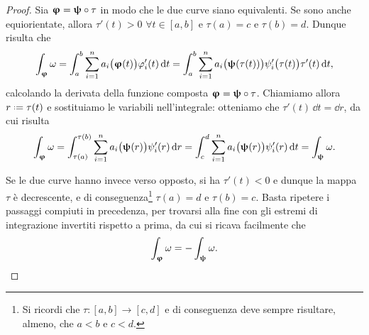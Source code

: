 \begin{proof}
	Sia $\bm{\upvarphi}=\bm{\uppsi}\circ\tau$ in modo che le due curve siano equivalenti.
	Se sono anche equiorientate, allora $\tau'(t)>0$ $\forall t\in[a,b]$ e $\tau(a)=c$ e $\tau(b)=d$.
	Dunque risulta che
	\begin{equation}
		\int_{\bm{\upvarphi}}\omega=\int_a^b\sum_{i=1}^na_i\big(\bm{\upvarphi}(t)\big)\varphi_i'(t)\,\textup{d} t
		=\int_a^b\sum_{i=1}^na_i\big(\bm{\uppsi}(\tau(t))\big)\psi_i'\big(\tau(t)\big)\tau'(t)\,\textup{d} t,
	\end{equation}
	calcolando la derivata della funzione composta $\bm{\upvarphi}=\bm{\uppsi}\circ\tau$.
	Chiamiamo allora $r\defeq\tau(t)$ e sostituiamo le variabili nell'integrale: otteniamo che $\tau'(t)\,\dd t=\dd r$, da cui risulta
	\begin{equation}
		\int_{\bm{\upvarphi}}\omega=\int_{\tau(a)}^{\tau(b)}\sum_{i=1}^na_i\big(\bm{\uppsi}(r)\big)\psi_i'(r)\,\textup{d} r
		=\int_c^d\sum_{i=1}^na_i\big(\bm{\uppsi}(r)\big)\psi_i'(r)\,\textup{d} t=\int_{\bm{\uppsi}}\omega.
	\end{equation}
	
	Se le due curve hanno invece verso opposto, si ha $\tau'(t)<0$ e dunque la mappa $\tau$ è decrescente, e di conseguenza\footnote{Si ricordi che $\tau\colon[a,b]\to[c,d]$ e di conseguenza deve sempre risultare, almeno, che $a<b$ e $c<d$.} $\tau(a)=d$ e $\tau(b)=c$. Basta ripetere i passaggi compiuti in precedenza, per trovarsi alla fine con gli estremi di integrazione invertiti rispetto a prima, da cui si ricava facilmente che
	\begin{equation*}
		\int_{\bm{\upvarphi}}\omega=-\int_{\bm{\uppsi}}\omega.\qedhere
	\end{equation*}
\end{proof}


